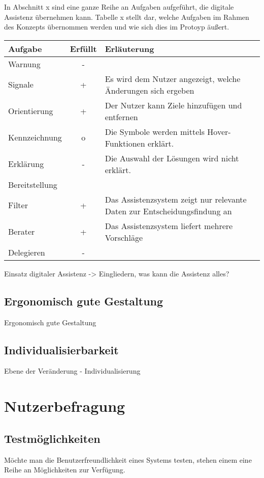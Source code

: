 In Abschnitt x sind eine ganze Reihe an Aufgaben aufgeführt, die digitale Assistenz übernehmen kann. Tabelle x stellt dar, welche Aufgaben im Rahmen des Konzepts übernommen werden und wie sich dies im Protoyp äußert.

\begin{table}
\centering
\begin{tabular}{p{}|c|p{}}
\textbf{Aufgabe} & \textbf{Erfüllt} & \textbf{Erläuterung} \\
\hline
Warnung & - & \\
\hline
Signale & + & Es wird dem Nutzer angezeigt, welche Änderungen sich ergeben\\
\hline
Orientierung & + & Der Nutzer kann Ziele hinzufügen und entfernen \\
\hline
Kennzeichnung & o & Die Symbole werden mittels Hover-Funktionen erklärt.\\
\hline
Erklärung & - & Die Auswahl der Lösungen wird nicht erklärt.\\
\hline
Bereitstellung & & \\
\hline
Filter & + & Das Assistenzsystem zeigt nur relevante Daten zur Entscheidungsfindung an \\
\hline
Berater & + & Das Assistenzsystem liefert mehrere Vorschläge \\
\hline
Delegieren & - & \\
\end{tabular}
\end{table}

Einsatz digitaler Assistenz -> Eingliedern, was kann die Assistenz alles?



\subsection*{Ergonomisch gute Gestaltung}
Ergonomisch gute Gestaltung

\subsection*{Individualisierbarkeit}
Ebene der Veränderung - Individualisierung


\section{Nutzerbefragung}


\subsection{Testmöglichkeiten}
Möchte man die Benutzerfreundlichkeit eines Systems testen, stehen einem eine Reihe an Möglichkeiten zur Verfügung.

